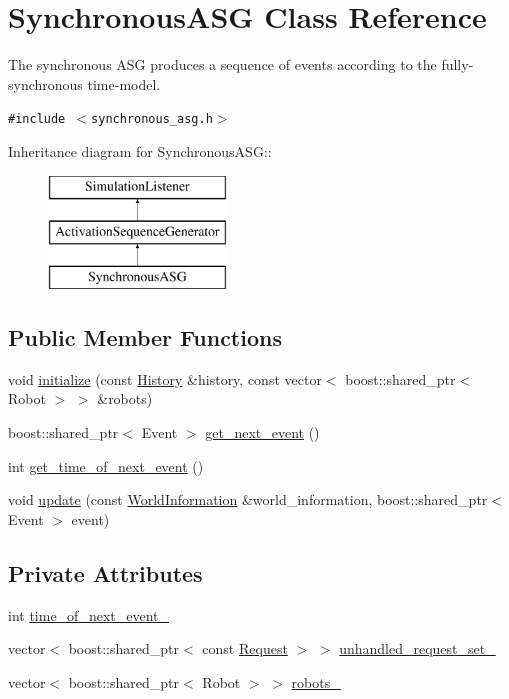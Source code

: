 \hypertarget{class_synchronous_a_s_g}{
\section{SynchronousASG Class Reference}
\label{class_synchronous_a_s_g}
}
The synchronous ASG produces a sequence of events according to the fully-synchronous time-model.  


{\tt \#include $<$synchronous\_\-asg.h$>$}

Inheritance diagram for SynchronousASG::\begin{figure}[H]
\begin{center}
\leavevmode
\includegraphics[height=3cm]{class_synchronous_a_s_g}
\end{center}
\end{figure}
\subsection*{Public Member Functions}
\begin{CompactItemize}
\item 
void \hyperlink{class_synchronous_a_s_g_05acba7c914bdb8b4080ef763c092993}{initialize} (const \hyperlink{class_history}{History} \&history, const vector$<$ boost::shared\_\-ptr$<$ Robot $>$ $>$ \&robots)
\item 
boost::shared\_\-ptr$<$ Event $>$ \hyperlink{class_synchronous_a_s_g_05fbdbd3ed9638ab90c3817944fbba95}{get\_\-next\_\-event} ()
\item 
int \hyperlink{class_synchronous_a_s_g_b675d2066e00287119c772b0411531b5}{get\_\-time\_\-of\_\-next\_\-event} ()
\item 
void \hyperlink{class_synchronous_a_s_g_4b85489783f05e0061c701a1dac51773}{update} (const \hyperlink{class_world_information}{WorldInformation} \&world\_\-information, boost::shared\_\-ptr$<$ Event $>$ event)
\end{CompactItemize}
\subsection*{Private Attributes}
\begin{CompactItemize}
\item 
int \hyperlink{class_synchronous_a_s_g_abb2e0b562aea4bc197c54e4a9298918}{time\_\-of\_\-next\_\-event\_\-}
\item 
vector$<$ boost::shared\_\-ptr$<$ const \hyperlink{class_request}{Request} $>$ $>$ \hyperlink{class_synchronous_a_s_g_decb1886c61bad1814a2d76f03b6021c}{unhandled\_\-request\_\-set\_\-}
\item 
vector$<$ boost::shared\_\-ptr$<$ Robot $>$ $>$ \hyperlink{class_synchronous_a_s_g_a2a7e5be2f90c3e875db299d27895346}{robots\_\-}
\end{CompactItemize}
